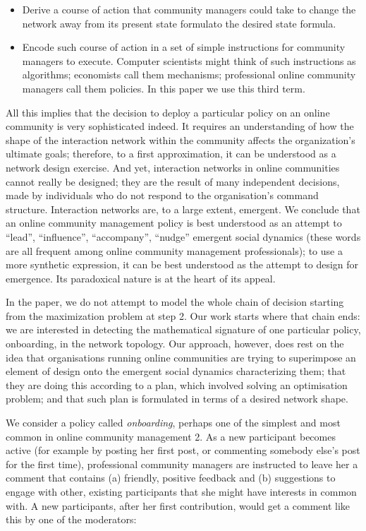 \begin{enumerate}
\begin{itemize}
	\item Derive a course of action that community managers could take to change the network away from its present state formulato the desired state formula.
	\item Encode such course of action in a set of simple instructions for community managers to execute. Computer scientists might think of such instructions as algorithms; economists call them mechanisms; professional online community managers call them policies. In this paper we use this third term. 
\end{itemize}
\end{enumerate}

All this implies that the decision to deploy a particular policy on an online community is very sophisticated indeed. It requires an understanding of how the shape of the interaction network within the community affects the organization's ultimate goals; therefore, to a first approximation, it can be understood as a network design exercise. And yet, interaction networks in online communities cannot really be designed; they are the result of many independent decisions, made by individuals who do not respond to the organisation's command structure. Interaction networks are, to a large extent, emergent. We conclude that an online community management policy is best understood as an attempt to “lead”, “influence”, “accompany”, “nudge” emergent social dynamics (these words are all  frequent among online community management professionals); to use a more synthetic expression, it can be best understood as the attempt to design for emergence. Its paradoxical nature is at the heart of its appeal. 

In the paper, we do not attempt to model the whole chain of decision starting from the maximization problem at step 2. Our work starts where that chain ends: we are interested in detecting the mathematical signature of one particular policy, onboarding, in the network topology. Our approach, however, does rest on the idea that organisations running online communities are trying to superimpose an element of design onto the emergent social dynamics characterizing them; that they are doing this according to a plan, which involved solving an optimisation problem; and that such plan is formulated in terms of a desired network shape. 

We consider a policy called \emph{onboarding}, perhaps one of the simplest and most common in online community management \cite{rheingold1993virtual, shirky2008here}2. As a new participant becomes active (for example by posting her first post, or commenting somebody else’s post for the first time), professional community managers are instructed to leave her a comment that contains (a) friendly, positive feedback and (b) suggestions to engage with other, existing participants that she might have interests in common with. A new participants, after her first contribution, would get a comment like this by one of the moderators:

